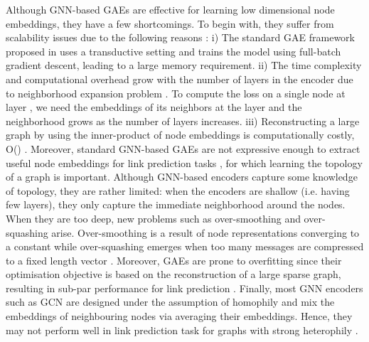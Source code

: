 \documentclass{article}
\begin{document}
Although GNN-based GAEs \citep{kipf2016variational} are effective for learning low dimensional node embeddings, they have a few shortcomings. To begin with, they suffer from scalability issues due to the following reasons \citep{chiang2019cluster}: i) The standard GAE framework proposed in \citep{kipf2016variational} uses a transductive setting and trains the model using full-batch gradient descent, leading to a large memory requirement. ii) The time complexity and computational overhead grow with the number of layers in the encoder due to neighborhood expansion problem \citep{chiang2019cluster}. To compute the loss on a single node at layer , we need the embeddings of its neighbors at the layer  and the neighborhood grows as the number of layers increases. iii) Reconstructing a large graph by using the inner-product of node embeddings is computationally costly, O() \citep{salha2021fastgae}. Moreover, standard GNN-based GAEs are not expressive enough to extract useful node embeddings for link prediction tasks \citep{pan2021neural, xu2018powerful, morris2019weisfeiler}, for which learning the topology of a graph is important. Although GNN-based encoders capture some knowledge of topology, they are rather limited: when the encoders are shallow (i.e. having few layers), they only capture the immediate neighborhood around the nodes. When they are too deep, new problems such as over-smoothing \cite{li2018deeper, chen2020measuring} and over-squashing \citep{alon2020bottleneck} arise. Over-smoothing is a result of node representations converging to a constant while over-squashing emerges when too many messages are compressed to a fixed length vector \citep{alon2020bottleneck}. Moreover, GAEs are prone to overfitting since their optimisation objective is based on the reconstruction of a large sparse graph, resulting in sub-par performance for link prediction \citep{Goyal_2018}. Finally, most GNN encoders such as GCN \citep{kipf2016semi} are designed under the assumption of homophily and mix the embeddings of neighbouring nodes via averaging their embeddings. Hence, they may not perform well in link prediction task for graphs with strong heterophily \citep{zhu2020beyond}.
\end{document}
